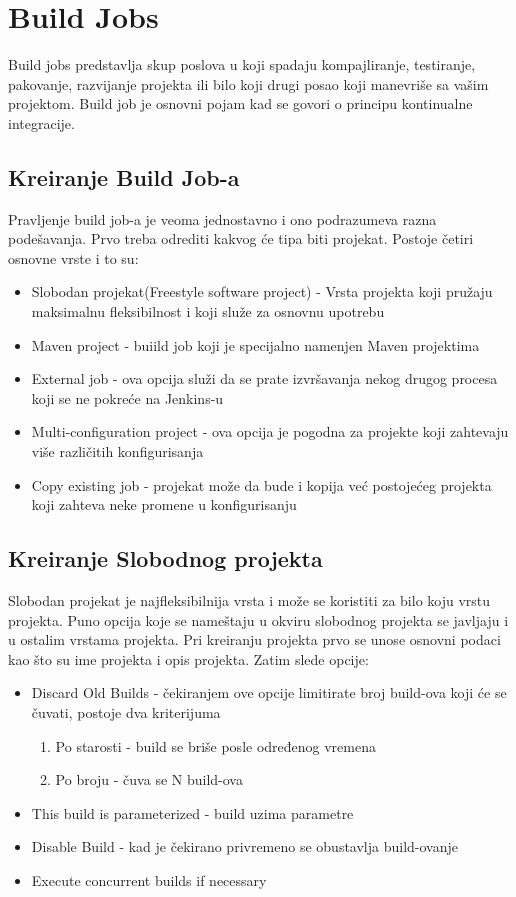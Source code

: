 \section{Build Jobs}

Build jobs predstavlja skup poslova u koji spadaju kompajliranje, testiranje, pakovanje, razvijanje projekta ili bilo koji drugi posao koji manevriše sa vašim projektom. Build job je osnovni pojam kad se govori o principu kontinualne integracije. 

\subsection{Kreiranje Build Job-a}

Pravljenje build job-a je veoma jednostavno i ono podrazumeva razna podešavanja. Prvo treba odrediti kakvog će tipa biti projekat. Postoje četiri osnovne vrste i to su:
\begin{itemize}  
\item Slobodan projekat(Freestyle software project) - Vrsta projekta koji pružaju maksimalnu fleksibilnost i koji služe za osnovnu upotrebu
\item Maven project - buiild job koji je specijalno namenjen Maven projektima 
\item External job - ova opcija služi da se prate izvršavanja nekog drugog procesa koji se ne pokreće na Jenkins-u
\item Multi-configuration project - ova opcija je pogodna za projekte koji zahtevaju više različitih konfigurisanja
\item Copy existing job - projekat može da bude i kopija već postojećeg projekta koji zahteva neke promene u konfigurisanju
\end{itemize}  

\subsection{Kreiranje Slobodnog projekta}

Slobodan projekat je najfleksibilnija vrsta i može se koristiti za bilo koju vrstu projekta. Puno opcija koje se nameštaju u okviru slobodnog projekta se javljaju i u ostalim vrstama projekta. Pri kreiranju projekta prvo se unose osnovni podaci kao što su ime projekta i opis projekta. Zatim slede opcije:

\begin{itemize}  
\item Discard Old Builds - čekiranjem ove opcije limitirate broj build-ova koji će se čuvati, postoje dva kriterijuma 
\begin{enumerate}
\item Po starosti - build se briše posle određenog vremena
\item Po broju - čuva se N build-ova
\end{enumerate}
\item This build is parameterized - build uzima parametre
\item Disable Build - kad je čekirano privremeno se obustavlja build-ovanje
\item Execute concurrent builds if necessary
\end{itemize}

